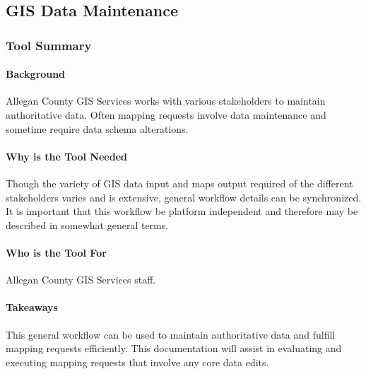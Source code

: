 %
%
%
%
%
\subsection{GIS Data Maintenance}

\subsubsection{Tool Summary}

\begin{adjmulticols}{2}{\innerMar}{\outerMar}
\paragraph{Background}
\noindent Allegan County GIS Services works with various stakeholders to maintain authoritative data.  Often mapping requests involve data maintenance and sometime require data schema alterations.
\paragraph{Why is the Tool Needed}
\noindent Though the variety of GIS data input and maps output required of the different stakeholders varies and is extensive, general workflow details can be synchronized.   It is important that this workflow be platform independent and therefore may be described in somewhat general terms.
\paragraph{Who is the Tool For}
\noindent Allegan County GIS Services staff.
\paragraph{Takeaways}
\noindent This general workflow can be used to maintain authoritative data and fulfill mapping requests efficiently.  This documentation will assist in evaluating and executing mapping requests that involve any core data edits.

\end{adjmulticols}

